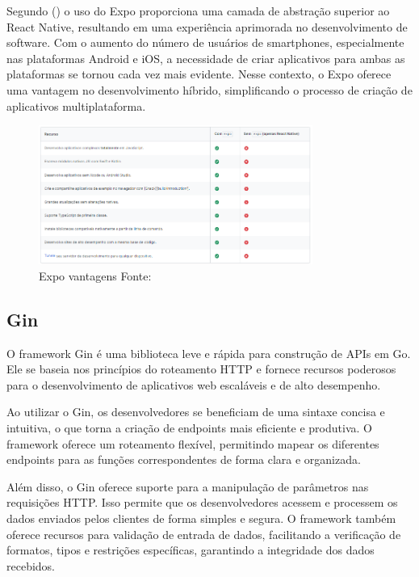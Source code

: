 Segundo (\textcite{Hugo}) o uso do Expo proporciona uma camada de abstração superior ao React Native, resultando em uma experiência aprimorada no desenvolvimento de software. Com o aumento do 
número de usuários de smartphones, especialmente nas plataformas Android e iOS, a necessidade de criar aplicativos para ambas as plataformas se tornou cada vez mais 
evidente. Nesse contexto, o Expo oferece uma vantagem no desenvolvimento híbrido, simplificando o processo de criação de aplicativos multiplataforma.

\begin{figure}[htb]
	\caption{\label{fig:Fig_1}Expo vantagens Fonte: \cite{Expo}}
	\begin{center}
		\includegraphics[width=0.8\textwidth]{images/expo.png}
	\end{center}
\end{figure}


\subsection{Gin}
O framework Gin é uma biblioteca leve e rápida para construção de APIs em Go. Ele se baseia nos princípios do roteamento HTTP e fornece recursos poderosos para o desenvolvimento de aplicativos web escaláveis e de alto desempenho.

Ao utilizar o Gin, os desenvolvedores se beneficiam de uma sintaxe concisa e intuitiva, o que torna a criação de endpoints mais eficiente e produtiva. O framework oferece um roteamento flexível, permitindo mapear os diferentes endpoints para as funções correspondentes de forma clara e organizada.

Além disso, o Gin oferece suporte para a manipulação de parâmetros nas requisições HTTP. Isso permite que os desenvolvedores acessem e processem os dados enviados pelos clientes de forma simples e segura. O framework também oferece recursos para validação de entrada de dados, facilitando a verificação de formatos, tipos e restrições específicas, garantindo a integridade dos dados recebidos.

